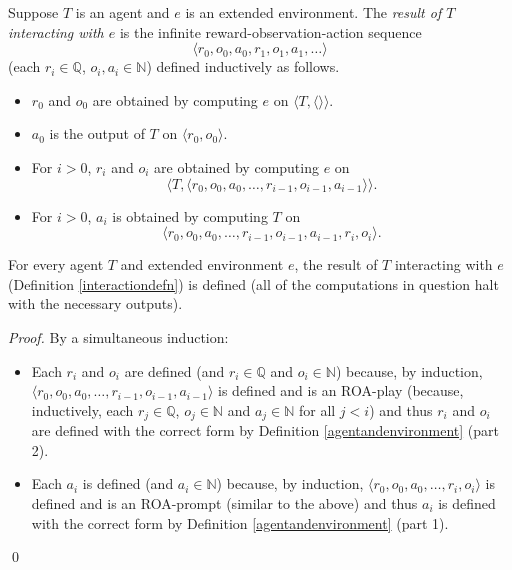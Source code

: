 \documentclass[runningheads]{llncs}
\begin{document}
\begin{definition}
\label{interactiondefn}
    Suppose $T$ is an agent and $e$ is an extended environment.
    The \emph{result of $T$ interacting with $e$} is the infinite
    reward-observation-action sequence
    \[\langle r_0,o_0,a_0,r_1,o_1,a_1,\ldots\rangle\]
    (each $r_i\in\mathbb Q$, $o_i,a_i\in\mathbb N$)
    defined inductively as follows.
    \begin{itemize}
        \item $r_0$ and $o_0$ are obtained by computing $e$ on
        $\langle T,\langle\rangle\rangle$.
        \item $a_0$ is the output of $T$ on $\langle r_0,o_0\rangle$.
        \item For $i>0$, $r_i$ and $o_i$ are obtained by computing $e$
        on
        \[\langle T,\langle r_0,o_0,a_0,\ldots,r_{i-1},o_{i-1},a_{i-1}\rangle\rangle.\]
        \item For $i>0$, $a_i$ is obtained by computing $T$ on
        \[\langle r_0,o_0,a_0,\ldots,r_{i-1},o_{i-1},a_{i-1},r_i,o_i\rangle.\]
    \end{itemize}
\end{definition}

\begin{lemma}
    For every agent $T$ and extended environment $e$, the result of $T$ interacting
    with $e$ (Definition \ref{interactiondefn}) is defined (all of the computations
    in question halt with the necessary outputs).
\end{lemma}

\begin{proof}
    By a simultaneous induction:
    \begin{itemize}
        \item
        Each $r_i$ and $o_i$ are defined (and $r_i\in\mathbb Q$
        and $o_i\in\mathbb N$) because, by induction,
        $\langle r_0,o_0,a_0,\ldots,r_{i-1},o_{i-1},a_{i-1}\rangle$
        is defined and is an ROA-play (because, inductively,
        each $r_j\in\mathbb Q$, $o_j\in\mathbb N$ and $a_j\in\mathbb N$
        for all $j<i$) and thus
        $r_i$ and $o_i$ are defined with the correct form by
        Definition \ref{agentandenvironment} (part 2).
        \item
        Each $a_i$ is defined (and $a_i\in\mathbb N$) because, by induction,
        $\langle r_0,o_0,a_0,\ldots,r_i,o_i\rangle$
        is defined and is an ROA-prompt (similar to the above) and thus
        $a_i$ is defined with the correct form by Definition
        \ref{agentandenvironment} (part 1).
    \end{itemize}
    \qed
\end{proof}
\end{document}
